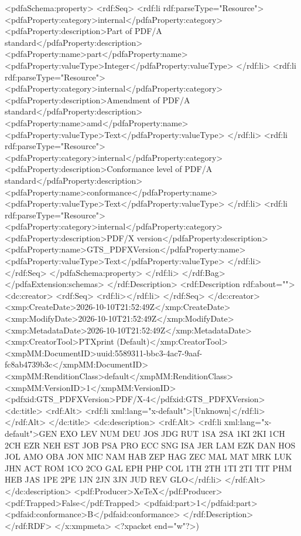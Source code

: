 {              <pdfaSchema:property>
                <rdf:Seq>
                  <rdf:li rdf:parseType="Resource">
                    <pdfaProperty:category>internal</pdfaProperty:category>
                    <pdfaProperty:description>Part of PDF/A standard</pdfaProperty:description>
                    <pdfaProperty:name>part</pdfaProperty:name>
                    <pdfaProperty:valueType>Integer</pdfaProperty:valueType>
                  </rdf:li>
                  <rdf:li rdf:parseType="Resource">
                    <pdfaProperty:category>internal</pdfaProperty:category>
                    <pdfaProperty:description>Amendment of PDF/A standard</pdfaProperty:description>
                    <pdfaProperty:name>amd</pdfaProperty:name>
                    <pdfaProperty:valueType>Text</pdfaProperty:valueType>
                  </rdf:li>
                  <rdf:li rdf:parseType="Resource">
                    <pdfaProperty:category>internal</pdfaProperty:category>
                    <pdfaProperty:description>Conformance level of PDF/A standard</pdfaProperty:description>
                    <pdfaProperty:name>conformance</pdfaProperty:name>
                    <pdfaProperty:valueType>Text</pdfaProperty:valueType>
                  </rdf:li>
                  <rdf:li rdf:parseType="Resource">
                    <pdfaProperty:category>internal</pdfaProperty:category>
                    <pdfaProperty:description>PDF/X version</pdfaProperty:description>
                    <pdfaProperty:name>GTS_PDFXVersion</pdfaProperty:name>
                    <pdfaProperty:valueType>Text</pdfaProperty:valueType>
                  </rdf:li>
                </rdf:Seq>
              </pdfaSchema:property>
            </rdf:li>
          </rdf:Bag>
        </pdfaExtension:schemas>
      </rdf:Description>
      <rdf:Description rdf:about="">
        <dc:creator>
          <rdf:Seq>
            <rdf:li></rdf:li>
          </rdf:Seq>
        </dc:creator>
        <xmp:CreateDate>2026-10-10T21:52:49Z</xmp:CreateDate>
        <xmp:ModifyDate>2026-10-10T21:52:49Z</xmp:ModifyDate>
        <xmp:MetadataDate>2026-10-10T21:52:49Z</xmp:MetadataDate>
        <xmp:CreatorTool>PTXprint (Default)</xmp:CreatorTool>
        <xmpMM:DocumentID>uuid:5589311-bbc3-4ac7-9aaf-fc8ab4739b3c</xmpMM:DocumentID>
        <xmpMM:RenditionClass>default</xmpMM:RenditionClass>
        <xmpMM:VersionID>1</xmpMM:VersionID>
        <pdfxid:GTS_PDFXVersion>PDF/X-4</pdfxid:GTS_PDFXVersion>
        <dc:title>
          <rdf:Alt>
            <rdf:li xml:lang="x-default">[Unknown]</rdf:li>
          </rdf:Alt>
        </dc:title>
        <dc:description>
          <rdf:Alt>
            <rdf:li xml:lang="x-default">GEN EXO LEV NUM DEU JOS JDG RUT 1SA 2SA 1KI 2KI 1CH 2CH EZR NEH EST JOB PSA PRO ECC SNG ISA JER LAM EZK DAN HOS JOL AMO OBA JON MIC NAM HAB ZEP HAG ZEC MAL MAT MRK LUK JHN ACT ROM 1CO 2CO GAL EPH PHP COL 1TH 2TH 1TI 2TI TIT PHM HEB JAS 1PE 2PE 1JN 2JN 3JN JUD REV GLO</rdf:li>
          </rdf:Alt>
        </dc:description>
        <pdf:Producer>XeTeX</pdf:Producer>
        <pdf:Trapped>False</pdf:Trapped>
      <pdfaid:part>1</pdfaid:part>
      <pdfaid:conformance>B</pdfaid:conformance>
      </rdf:Description>
  </rdf:RDF>
</x:xmpmeta>
<?xpacket end="w"?>)}
